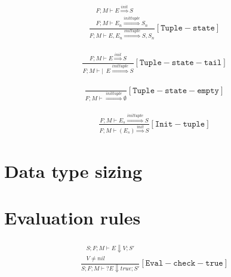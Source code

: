 \documentclass{scrartcl}
\begin{document}
    \begin{align*}
    \frac{
        \begin{matrix}
        F; M \vdash E \overset{init}{\Rightarrow} S \\
        F; M \vdash E_n \overset{inittuple}{\Rightarrow} S_n
        \end{matrix}
    }{
        F; M \vdash E, E_n \overset{inittuple}{\Rightarrow} S, S_n
    }[\mathtt{Tuple-state}]
    \end{align*}
    
    \begin{align*}
    \frac{
        \begin{matrix}
        F; M \vdash E \overset{init}{\Rightarrow} S
        \end{matrix}
    }{
        F; M \vdash | \enspace E \overset{inittuple}{\Rightarrow} S
    }[\mathtt{Tuple-state-tail}]
    \end{align*}
    
    \begin{align*}
    \frac{}{
        F; M \vdash \overset{inittuple}{\Rightarrow} \emptyset
    }[\mathtt{Tuple-state-empty}]
    \end{align*}
    
    \begin{align*}
    \frac{
        F; M \vdash E_s \overset{inittuple}{\Rightarrow} S
    }{
        F; M \vdash ( E_s ) \overset{init}{\Rightarrow} S
    }[\mathtt{Init-tuple}]
    \end{align*}
    
    \section{Data type sizing}
    
    

    \section{Evaluation rules}
    
    \begin{align*}
    \frac{
        \begin{matrix}
        S; F; M \vdash E \Downarrow V; S' \\
        V \neq nil
        \end{matrix}
    }{
        S; F; M \vdash ?E \Downarrow true; S'
    }[\mathtt{Eval-check-true}]
    \end{align*}
    
\end{document}

